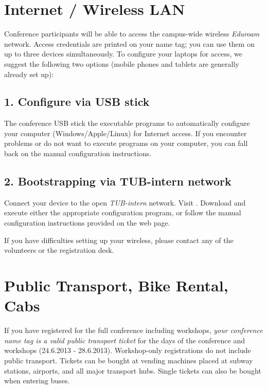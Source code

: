 \section{Internet / Wireless LAN}

Conference participants will be able to access the campus-wide wireless \emph{Eduroam} network. Access credentials are printed on your name tag; you can use them on up to three devices simultaneously. To configure your laptops for access, we suggest the following two options (mobile phones and tablets are generally already set up):

\subsection{1. Configure via USB stick}
The conference USB stick  the executable programs to automatically configure your computer (Windows/Apple/Linux) for Internet access. If you encounter problems or do not want to execute programs on your computer, you can fall back on the manual configuration instructions.

\subsection{2. Bootstrapping via TUB-intern network}
Connect your device to the open \emph{TUB-intern} network. Visit . Download and execute either the appropriate configuration program, or follow the manual configuration instructions provided on the web page.

If you have difficulties setting up your wireless, please contact any of the volunteers or the registration desk.


 \section{Public Transport, Bike Rental, Cabs}

If you have registered for the full conference including workshops, \emph{your conference name tag is a valid public transport ticket} for the days of the conference and workshops (24.6.2013 - 28.6.2013). Workshop-only registrations do not include public transport. Tickets can be bought at vending machines placed at subway stations, airports, and all major transport hubs. Single tickets can also be bought when entering buses.

